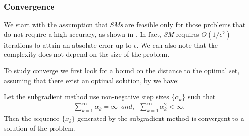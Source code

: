 \subsubsection{Convergence}
We start with the assumption that \textit{SMs} are feasible only for those problems that do not require a high accuracy, as shown in \cite{subgrad_fra}. In fact, \textit{SM} requires $\Theta (1/\epsilon^2)$ iterations to attain an absolute error up to $\epsilon$. We can also note that the complexity does not depend on the size of the problem.

To study converge we first look for a bound on the distance to the optimal set, assuming that there exist an optimal solution, by \parencite[Theorem 7.4]{nonlinearrus} we have:
\begin{thm}
\label{thm:dmn}
Let the subgradient method use non-negative step sizes $\{\alpha_k\}$ such that
\begin{align}
\label{eq:dimin}
    &\sum_{k=1}^\infty\alpha_k = \infty\, \, \, and,\, \, \, \sum_{k=1}^\infty\alpha_k^2 < \infty.
\end{align}
Then the sequence $\{x_k\}$ generated by the subgradient method is convergent to a solution of the problem.
\end{thm}
